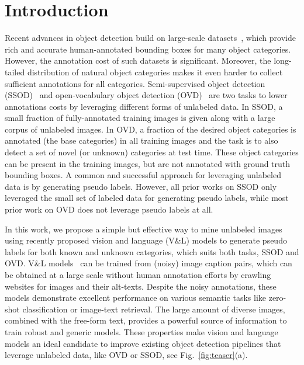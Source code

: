 \documentclass[runningheads]{llncs}
\begin{document}
\section{Introduction}

Recent advances in object detection build on large-scale datasets~\cite{gupta2019lvis,OpenImages,Objects365}, which provide rich and accurate human-annotated bounding boxes for many object categories.
However, the annotation cost of such datasets is significant.  Moreover, the long-tailed distribution of natural object categories makes it even harder to collect sufficient annotations for all categories. 
Semi-supervised object detection (SSOD)~\cite{sohn2020detection,zhou_cvpr_21} and open-vocabulary object detection (OVD)~\cite{bansal2018zero,gu_iclr_22,zareian_cvpr_21} are two tasks to lower annotations costs by leveraging different forms of unlabeled data.  In SSOD, a small fraction of fully-annotated training images is given along with a large corpus of unlabeled images.  In OVD, a fraction of the desired object categories is annotated (the base categories) in all training images and the task is to also detect a set of novel (or unknown) categories at test time.  These object categories can be present in the training images, but are not annotated with ground truth bounding boxes.  A common and successful approach for leveraging unlabeled data is by generating pseudo labels.  However, all prior works on SSOD only leveraged the small set of labeled data for generating pseudo labels, while most prior work on OVD does not leverage pseudo labels at all.

In this work, we propose a simple but effective way to mine unlabeled images using recently proposed vision and language (V\&L) models to generate pseudo labels for both known and unknown categories, which suits both tasks, SSOD and OVD.
V\&L models~\cite{jia_icml_21,ALBEF,radford_arxiv_2021} can be trained from (noisy) image caption pairs, which can be obtained at a large scale without human annotation efforts by crawling websites for images and their alt-texts.  Despite the noisy annotations, these models demonstrate excellent performance on various semantic tasks like zero-shot classification or image-text retrieval.  The large amount of diverse images, combined with the free-form text, provides a powerful source of information to train robust and generic models.
These properties make vision and language models an ideal candidate to improve existing object detection pipelines that leverage unlabeled data, like OVD or SSOD, see Fig.~\ref{fig:teaser}(a).
\end{document}
